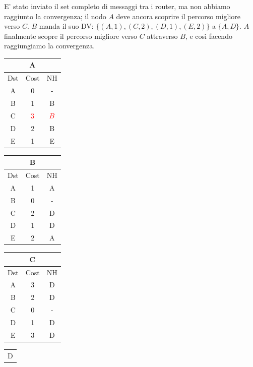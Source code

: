 \documentclass[10pt]{article}
\begin{document}
			\newline \newline
			E' stato inviato il set completo di messaggi tra i router, ma non abbiamo raggiunto la convergenza; il nodo $A$ deve ancora scoprire il percorso migliore verso $C$.
			\newline \newline
			$B$ manda il suo DV: $\{(A,1),(C,2),(D,1),(E,2)\}$ a $\{A,D\}$.
			\newline
			$A$ finalmente scopre il percorso migliore verso $C$ attraverso $B$, e così facendo raggiungiamo la convergenza.
			\begin{table}[h!]
				\begin{tabular}{|c||c||c|}
					\hline
					\multicolumn{3}{|c|}{A} \\
					\hline
					Dst & Cost & NH \\
					\hline
					A & 0 & - \\
					B & 1 & B \\
					C & $\color{red} 3$ & $\color{red} B$ \\
					D & 2 & B \\
					E & 1 & E \\
					\hline
				\end{tabular}
				\begin{tabular}{|c||c||c|}
					\hline
					\multicolumn{3}{|c|}{B} \\
					\hline
					Dst & Cost & NH \\
					\hline
					A & 1 & A \\
					B & 0 & - \\
					C & 2 & D \\
					D & 1 & D \\
					E & 2 & A \\
					\hline
				\end{tabular}
				\begin{tabular}{|c||c||c|}
					\hline
					\multicolumn{3}{|c|}{C} \\
					\hline
					Dst & Cost & NH \\
					\hline
					A & 3 & D \\
					B & 2 & D \\
					C & 0 & - \\
					D & 1 & D \\
					E & 3 & D \\
					\hline
				\end{tabular}
				\begin{tabular}{|c||c||c|}
					\hline
					\multicolumn{3}{|c|}{D} \\

\end{tabular}
\end{table}
\end{document}

